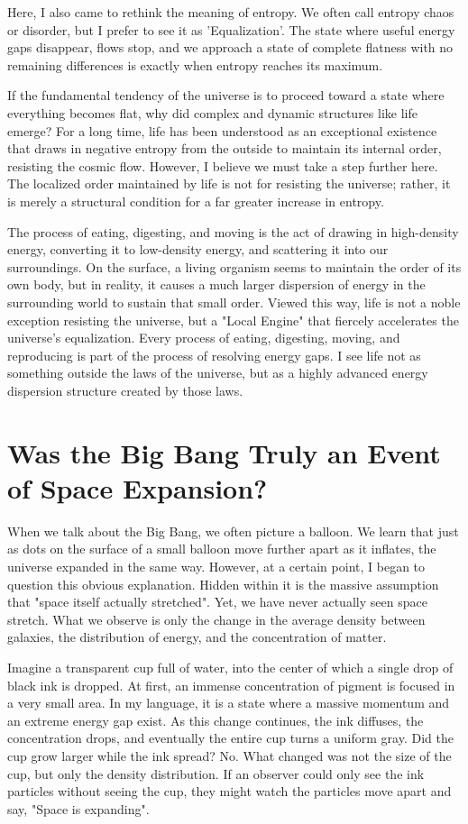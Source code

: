 \documentclass[11pt,a4paper]{article}
\begin{document}
Here, I also came to rethink the meaning of entropy. We often call entropy chaos or disorder, but I prefer to see it as 'Equalization'. The state where useful energy gaps disappear, flows stop, and we approach a state of complete flatness with no remaining differences is exactly when entropy reaches its maximum.

If the fundamental tendency of the universe is to proceed toward a state where everything becomes flat, why did complex and dynamic structures like life emerge? For a long time, life has been understood as an exceptional existence that draws in negative entropy from the outside to maintain its internal order, resisting the cosmic flow. However, I believe we must take a step further here. The localized order maintained by life is not for resisting the universe; rather, it is merely a structural condition for a far greater increase in entropy.

The process of eating, digesting, and moving is the act of drawing in high-density energy, converting it to low-density energy, and scattering it into our surroundings. On the surface, a living organism seems to maintain the order of its own body, but in reality, it causes a much larger dispersion of energy in the surrounding world to sustain that small order. Viewed this way, life is not a noble exception resisting the universe, but a "Local Engine" that fiercely accelerates the universe's equalization. Every process of eating, digesting, moving, and reproducing is part of the process of resolving energy gaps. I see life not as something outside the laws of the universe, but as a highly advanced energy dispersion structure created by those laws.

\section*{Was the Big Bang Truly an Event of Space Expansion?}
When we talk about the Big Bang, we often picture a balloon. We learn that just as dots on the surface of a small balloon move further apart as it inflates, the universe expanded in the same way. However, at a certain point, I began to question this obvious explanation. Hidden within it is the massive assumption that "space itself actually stretched". Yet, we have never actually seen space stretch. What we observe is only the change in the average density between galaxies, the distribution of energy, and the concentration of matter.

Imagine a transparent cup full of water, into the center of which a single drop of black ink is dropped. At first, an immense concentration of pigment is focused in a very small area. In my language, it is a state where a massive momentum and an extreme energy gap exist. As this change continues, the ink diffuses, the concentration drops, and eventually the entire cup turns a uniform gray. Did the cup grow larger while the ink spread? No. What changed was not the size of the cup, but only the density distribution. If an observer could only see the ink particles without seeing the cup, they might watch the particles move apart and say, "Space is expanding".
\end{document}
